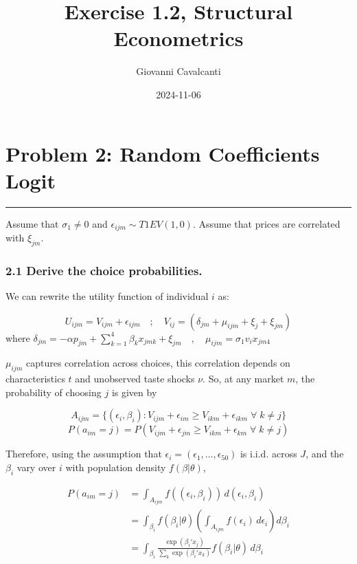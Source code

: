 \documentclass[
]{article}
\title{Exercise 1.2, Structural Econometrics}
\author{Giovanni Cavalcanti}
\date{2024-11-06}
\begin{document}
\maketitle

\section{Problem 2: Random Coefficients
Logit}\label{problem-2-random-coefficients-logit}

\begin{center}\rule{0.5\linewidth}{0.5pt}\end{center}

Assume that \(\sigma_1 \neq 0\) and \(\epsilon_{ijm} \sim T1EV(1, 0)\).
Assume that prices are correlated with \(\xi_{jm}\).

\subsubsection{2.1 Derive the choice
probabilities.}\label{derive-the-choice-probabilities.}

We can rewrite the utility function of individual \(i\) as:

\[
U_{ijm} = V_{ijm} + \epsilon_{ijm} \quad ; \quad V_{ij} =(\delta_{jm} + \mu_{ijm} + \xi_{j} + \xi_{jm})
\] where
\(\delta_{jm} = -\alpha p_{jm} + \sum_{k=1}^4 \beta_k x_{jmk} + \xi_{jm} \quad , \quad \mu_{ijm} = \sigma_1 v_i x_{jm4}\)

\(\mu_{ijm}\) captures correlation across choices, this correlation
depends on characteristics \(t\) and unobserved taste shocks \(\nu\).
So, at any market \(m\), the probability of choosing \(j\) is given by

\[
A_{ijm} = \{(\epsilon_i, \beta_i) : V_{ijm} + \epsilon_{im} \geq V_{ikm} + \epsilon_{ikm} \; \forall \; k \neq j \}
\] \[
P(a_{im} = j) = P(V_{ijm} + \epsilon_{jm} \geq V_{ikm} + \epsilon_{km} \; \forall \; k \neq j)
\]

Therefore, using the assumption that
\(\epsilon_i = (\epsilon_1, \ldots, \epsilon_{50})\) is i.i.d. across
\(J\), and the \(\beta_i\) vary over \(i\) with population density
\(f(\beta | \theta)\),

\begin{align*}
P(a_{im} = j) &= \int_{A_{ijm}} f((\epsilon_i, \beta_i)) \, d(\epsilon_i, \beta_i) \\
&= \int_{\beta_i} f(\beta_i | \theta) \left( \int_{A_{ijm}} f(\epsilon_i) \, d\epsilon_i \right) d\beta_i \\
&= \int_{\beta_i} \frac{\exp(\beta_i' x_j)}{\sum_k \exp(\beta_i' x_k)} f(\beta_i | \theta) \, d\beta_i
\end{align*}
\end{document}
